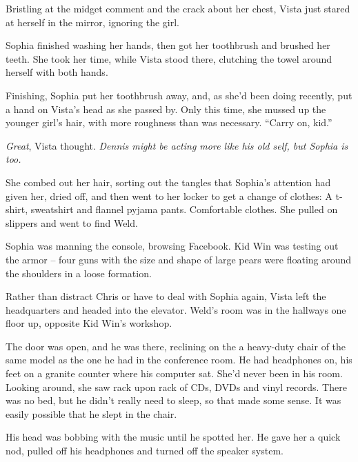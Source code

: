 Bristling at the midget comment and the crack about her chest, Vista just stared at herself in the mirror, ignoring the girl.



Sophia finished washing her hands, then got her toothbrush and brushed her teeth.  She took her time, while Vista stood there, clutching the towel around herself with both hands.



Finishing, Sophia put her toothbrush away, and, as she'd been doing recently, put a hand on Vista's head as she passed by.  Only this time, she mussed up the younger girl's hair, with more roughness than was necessary.  ``Carry on, kid.''



\emph{Great}, Vista thought.  \emph{Dennis might be acting more like his old self, but Sophia is too.}



She combed out her hair, sorting out the tangles that Sophia's attention had given her, dried off, and then went to her locker to get a change of clothes: A t-shirt, sweatshirt and flannel pyjama pants.  Comfortable clothes.  She pulled on slippers and went to find Weld.



Sophia was manning the console, browsing Facebook.  Kid Win was testing out the armor – four guns with the size and shape of large pears were floating around the shoulders in a loose formation.



Rather than distract Chris or have to deal with Sophia again, Vista left the headquarters and headed into the elevator.  Weld's room was in the hallways one floor up, opposite Kid Win's workshop.



The door was open, and he was there, reclining on the a heavy-duty chair of the same model as the one he had in the conference room.  He had headphones on, his feet on a granite counter where his computer sat.  She'd never been in his room.  Looking around, she saw rack upon rack of CDs, DVDs and vinyl records.  There was no bed, but he didn't really need to sleep, so that made some sense.  It was easily possible that he slept in the chair.



His head was bobbing with the music until he spotted her.  He gave her a quick nod, pulled off his headphones and turned off the speaker system.




